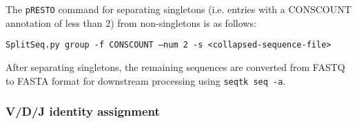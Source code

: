 
The \texttt{pRESTO} command for separating singletons (i.e. entries with a CONSCOUNT annotation of less than 2) from non-singletons is as follows:

\texttt{SplitSeq.py group -f CONSCOUNT --num 2 -s <collapsed-sequence-file>}

After separating singletons, the remaining sequences are converted from FASTQ to FASTA format for downstream processing using \texttt{seqtk seq -a}.

\subsubsection{V/D/J identity assignment}